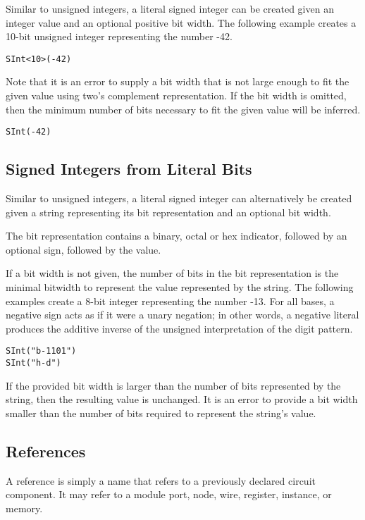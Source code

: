 \documentclass[12pt]{article}
\begin{document}
Similar to unsigned integers, a literal signed integer can be created given an integer value and an optional positive bit width. The following example creates a 10-bit unsigned integer representing the number -42.
\begin{lstlisting}
SInt<10>(-42)
\end{lstlisting}

Note that it is an error to supply a bit width that is not large enough to fit the given value using two's complement representation. If the bit width is omitted, then the minimum number of bits necessary to fit the given value will be inferred.
\begin{lstlisting}
SInt(-42)
\end{lstlisting}

\subsection{Signed Integers from Literal Bits}

Similar to unsigned integers, a literal signed integer can alternatively be created given a string representing its bit representation and an optional bit width.

The bit representation contains a binary, octal or hex indicator, followed by an optional sign, followed by the value.

If a bit width is not given, the number of bits in the bit representation is the minimal bitwidth to represent the value represented by the string. The following examples create a 8-bit integer representing the number -13. For all bases, a negative sign acts as if it were a unary negation; in other words, a negative literal produces the additive inverse of the unsigned interpretation of the digit pattern.
\begin{lstlisting}
SInt("b-1101")
SInt("h-d")
\end{lstlisting}

If the provided bit width is larger than the number of bits represented by the string, then the resulting value is unchanged.
It is an error to provide a bit width smaller than the number of bits required to represent the string's value.

\subsection{References}
A reference is simply a name that refers to a previously declared circuit component. It may refer to a module port, node, wire, register, instance, or memory.
\end{document}
